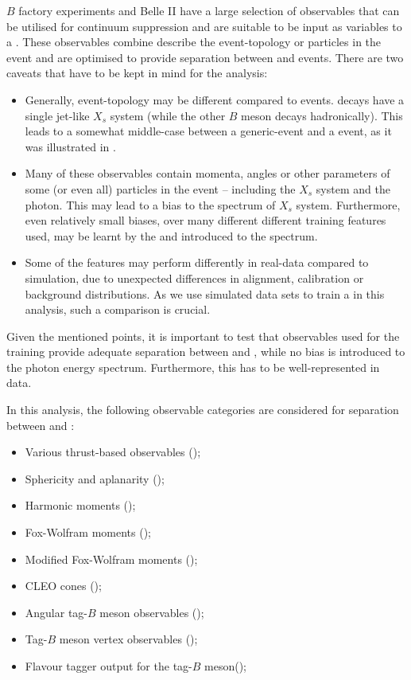 $B$ factory experiments and Belle II have a large selection of observables that can be utilised for continuum suppression and are suitable to be input as variables to a \BDT.
These observables combine describe the event-topology or particles in the event and are optimised to provide separation between \BB and \qqbar events.
There are two caveats that have to be kept in mind for the \BtoXsgamma analysis:
\begin{itemize}
    \item Generally, \BtoXsgamma event-topology may be different compared to \BB events. 
    \BtoXsgamma decays have a single jet-like $X_s$ system (while the other $B$ meson decays hadronically).
    This leads to a somewhat middle-case between a generic-\BB event and a \epem\ra\qqbar event, as it was illustrated in .
    \item Many of these observables contain momenta, angles or other parameters of some (or even all) particles in the event -- including the $X_s$ system and the photon.
    This may lead to a bias to the spectrum of $X_s$ system.
    Furthermore, even relatively small biases, over many different different training features used, may be learnt by the \BDT and introduced to the spectrum.
    \item Some of the features may perform differently in real-data compared to simulation, due to unexpected differences in alignment, calibration or background distributions.
    As we use simulated data sets to train a \BDT in this analysis, such a comparison is crucial.
\end{itemize}
Given the mentioned points, it is important to test that observables used for the training provide adequate separation between \BtoXsgamma and \qqbar, while no bias is introduced to the photon energy spectrum.
Furthermore, this has to be well-represented in data.

In this analysis, the following observable categories are considered for separation between \epem\ra\qqbar and \BtoXsgamma:
\begin{itemize}
    \item Various thrust-based observables ();
    \item Sphericity and aplanarity ();
    \item Harmonic moments ();
    \item Fox-Wolfram moments ();
    \item Modified Fox-Wolfram moments ();
    \item CLEO cones ();
    \item Angular tag-$B$ meson observables ();
    \item Tag-$B$ meson vertex observables ();
    \item Flavour tagger output for the tag-$B$ meson();
\end{itemize}


